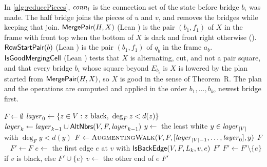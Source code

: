 In \cref{alg:reducePieces}, $\mathit{conn}_i$ is the connection set of the state before bridge $b_i$
was made.
The half bridge joins the pieces of $u$ and $v$, and  removes the bridges while
keeping that join.
$\textsf{MergePair}(H,X)$ (Lean ) is the pair $(b_1,f_1)$ of $X$ in the frame with front
top when the bottom of $X$ is dark and front right otherwise ().
$\textsf{RowStartPair}(b)$ (Lean ) is the pair $(b_1,f_1)$ of $q_b$ in the frame
$a_b$.
$\textsf{IsGoodMergingCell}$ (Lean ) tests that $X$ is alternating, cut, and not a pair
square, and that every bridge $b_i$ whose square beyond $E_{b_i}$ is $X$ is lowered by the plan
started from $\textsf{MergePair}(H,X)$, so $X$ is good in the sense of Theorem~R.
The plan and the operations are computed and applied in the order $b_1,\dots,b_k$, newest bridge
first.

\begin{algorithm}[htbp]
\caption{ (Lean  with ,  and
  ) and  (Lean )}
\label{alg:findFactor}
\begin{algorithmic}[1]
  \State $F\gets\emptyset$
    \State $\mathit{layer}_0\gets\{z\in V : z \text{ black},\ \deg_F z<d(z)\}$
      \State $\mathit{layer}_k\gets\mathit{layer}_{k-1}\cup\textsf{AltNbrs}(V,F,\mathit{layer}_{k-1})$
    \EndFor
    \State $y\gets$ the least white $y\in\mathit{layer}_{|V|}$ with $\deg_F y<d(y)$
     \pcbreak
    \EndIf
    \State $F\gets\Call{AugmentingWalk}{V,F,[\var{layer}_{|V|-1},\dots,\var{layer}_0],y}$
  \EndFor
   \Return $F$
  \Else\ \Return \pcnone
  \EndIf
\EndFunction
\Statex
{}
  \State $F'\gets F$
      \State $e\gets$ the first edge $e$ at $v$ with $\textsf{IsBackEdge}(V,F,L_k,v,e)$
       \Return $F'$
      \EndIf
      \State $F'\gets F'\setminus\{e\}$ if $v$ is black, else $F'\cup\{e\}$
      \State $v\gets$ the other end of $e$
    \EndIf
  \EndFor
  \State \Return $F'$
\EndFunction
\end{algorithmic}
\end{algorithm}


